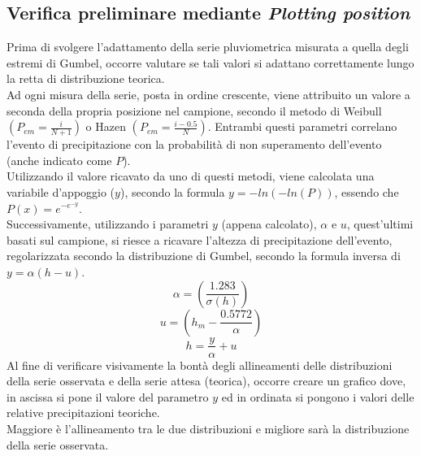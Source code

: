 \subsection{Verifica preliminare mediante \textit{Plotting position}}
\label{sec_plotting_position}
Prima di svolgere l'adattamento della serie pluviometrica misurata a quella degli estremi di Gumbel, occorre valutare se tali valori si adattano correttamente lungo la retta di distribuzione teorica.\\
Ad ogni misura della serie, posta in ordine crescente, viene attribuito un valore a seconda della propria posizione nel campione, secondo il metodo di Weibull $(P_{em}= \frac{i}{N+1})$ o Hazen $\left(P_{em}=\frac{i-0.5}{N}\right)$. Entrambi questi parametri correlano l'evento di precipitazione con la probabilità di non superamento dell'evento (anche indicato come $P$).\\
Utilizzando il valore ricavato da uno di questi metodi, viene calcolata una variabile d'appoggio ($y$), secondo la formula $y = -ln(-ln(P))$, essendo che $P(x)= e ^{-e^ {-y}}$.\\
\noindent Successivamente, utilizzando i parametri $y$ (appena calcolato), $\alpha$ e $u$, quest'ultimi basati sul campione, si riesce a ricavare l'altezza di precipitazione dell'evento, regolarizzata secondo la distribuzione di Gumbel, secondo la formula inversa di $y = \alpha (h - u)$.
\begin{equation}
    \alpha = \left(\frac{1.283}{\sigma(h)}\right)
\end{equation}
\begin{equation}
    u = \left( h_m - \frac{0.5772}{\alpha} \right)
\end{equation}
\begin{equation}
    h = \frac{y}{\alpha}+u
    \label{h_tr}
\end{equation}
Al fine di verificare visivamente la bontà degli allineamenti delle distribuzioni della serie osservata e della serie attesa (teorica), occorre creare un grafico dove, in ascissa si pone il valore del parametro $y$ ed in ordinata si pongono i valori delle relative precipitazioni teoriche.\\
Maggiore è l'allineamento tra le due distribuzioni e migliore sarà la distribuzione della serie osservata.

